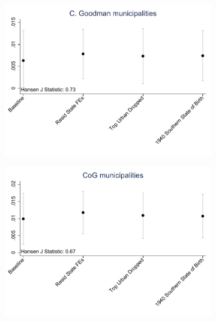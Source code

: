 \documentclass{article}
\begin{document}
\begin{landscape}
\begin{figure}[htbp]
    \centering
    \caption{Overidentification IV Tests, Balanced Controls}
    \begin{subfigure}{0.4\textwidth}
        \includegraphics[width=\linewidth]{figures/exogeneity_tests/D16_alt_inst_pooled_cgoodman_new_ctrls.pdf}
        \label{fig:sub1}
    \end{subfigure}
    \begin{subfigure}{0.4\textwidth}
        \includegraphics[width=\linewidth]{figures/exogeneity_tests/D16_alt_inst_pooled_gen_muni_new_ctrls.pdf}
        \label{fig:sub2}
    \end{subfigure}
    \begin{subfigure}{0.4\textwidth}

\end{subfigure}
\end{figure}
\end{landscape}
\end{document}
